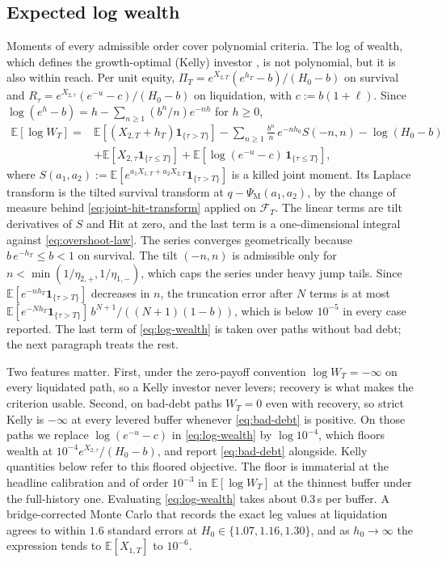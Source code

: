 \documentclass[11pt]{article}
\newcommand{\E}{\mathbb{E}}
\newcommand{\F}{\mathcal{F}}
\newcommand{\one}{\mathbf{1}}
\theoremstyle{plain}
\theoremstyle{definition}
\theoremstyle{remark}
\begin{document}
\subsection{Expected log wealth}\label{sec:log-wealth}
Moments of every admissible order cover polynomial criteria. The log of wealth, which defines the
growth-optimal (Kelly) investor \citep{Kelly1956,MacLeanThorpZiemba2011}, is not polynomial, but it
is also within reach. Per unit equity, $\Pi_T=e^{X_{2,T}}(e^{h_T}-b)/(H_0-b)$ on survival and
$R_\tau=e^{X_{2,\tau}}(e^{-u}-c)/(H_0-b)$ on liquidation, with $c:=b(1+\ell)$. Since
$\log(e^{h}-b)=h-\sum_{n\ge1}(b^n/n)e^{-nh}$ for $h\ge0$,
\begin{equation}\label{eq:log-wealth}
\begin{aligned}
\E[\log W_T]={}&\E\!\left[(X_{2,T}+h_T)\one_{\{\tau>T\}}\right]
-\sum_{n\ge1}\frac{b^n}{n}\,e^{-nh_0}S(-n,n)-\log(H_0-b)\\
&+\E\!\left[X_{2,\tau}\one_{\{\tau\le T\}}\right]
+\E\!\left[\log(e^{-u}-c)\,\one_{\{\tau\le T\}}\right],
\end{aligned}
\end{equation}
where $S(a_1,a_2):=\E[e^{a_1X_{1,T}+a_2X_{2,T}}\one_{\{\tau>T\}}]$ is a killed joint moment. Its
Laplace transform is the tilted survival transform at $q-\Psi_{\mathrm M}(a_1,a_2)$, by the change of
measure behind \eqref{eq:joint-hit-transform} applied on $\F_T$. The linear terms are tilt
derivatives of $S$ and $\mathrm{Hit}$ at zero, and the last term is a one-dimensional integral
against \eqref{eq:overshoot-law}. The series converges geometrically because
$b\,e^{-h_T}\le b<1$ on survival. The tilt $(-n,n)$ is admissible only for $n<\min(1/\eta_{2,+},1/\eta_{1,-})$, which
caps the series under heavy jump tails. Since $\E[e^{-nh_T}\one_{\{\tau>T\}}]$ decreases in $n$, the
truncation error after $N$ terms is at most $\E[e^{-Nh_T}\one_{\{\tau>T\}}]\,b^{N+1}/((N+1)(1-b))$,
which is below $10^{-5}$ in every case reported. The last term of \eqref{eq:log-wealth} is taken
over paths without bad debt; the next paragraph treats the rest.

Two features matter. First, under the zero-payoff convention $\log W_T=-\infty$ on every liquidated
path, so a Kelly investor never levers; recovery is what makes the criterion usable. Second, on
bad-debt paths $W_T=0$ even with recovery, so strict Kelly is $-\infty$ at every levered buffer
whenever \eqref{eq:bad-debt} is positive. On those paths we replace $\log(e^{-u}-c)$ in \eqref{eq:log-wealth}
by $\log10^{-4}$, which floors wealth at $10^{-4}e^{X_{2,\tau}}/(H_0-b)$, and report
\eqref{eq:bad-debt} alongside. Kelly quantities below refer to this floored objective. The floor is
immaterial at the headline calibration and of order $10^{-3}$ in $\E[\log W_T]$ at the thinnest
buffer under the full-history one. Evaluating \eqref{eq:log-wealth} takes about $0.3$\,s per buffer. A
bridge-corrected Monte Carlo that records the exact leg values at liquidation agrees to within $1.6$
standard errors at $H_0\in\{1.07,1.16,1.30\}$, and as $h_0\to\infty$ the expression tends to
$\E[X_{1,T}]$ to $10^{-6}$.
\end{document}
